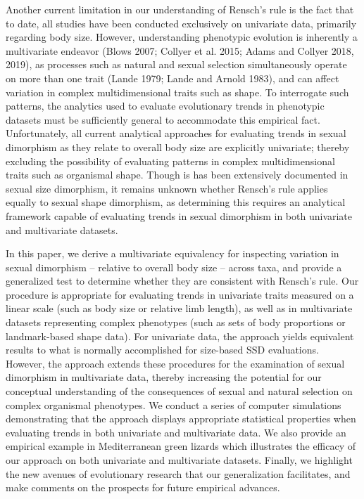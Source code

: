 \documentclass[]{article}
\begin{document}
Another current limitation in our understanding of Rensch's rule is the
fact that to date, all studies have been conducted exclusively on
univariate data, primarily regarding body size. However, understanding
phenotypic evolution is inherently a multivariate endeavor (Blows 2007;
Collyer et al. 2015; Adams and Collyer 2018, 2019), as processes such as
natural and sexual selection simultaneously operate on more than one
trait (Lande 1979; Lande and Arnold 1983), and can affect variation in
complex multidimensional traits such as shape. To interrogate such
patterns, the analytics used to evaluate evolutionary trends in
phenotypic datasets must be sufficiently general to accommodate this
empirical fact. Unfortunately, all current analytical approaches for
evaluating trends in sexual dimorphism as they relate to overall body
size are explicitly univariate; thereby excluding the possibility of
evaluating patterns in complex multidimensional traits such as
organismal shape. Though is has been extensively documented in sexual
size dimorphism, it remains unknown whether Rensch's rule applies
equally to sexual shape dimorphism, as determining this requires an
analytical framework capable of evaluating trends in sexual dimorphism
in both univariate and multivariate datasets. \hfill\break

In this paper, we derive a multivariate equivalency for inspecting
variation in sexual dimorphism -- relative to overall body size --
across taxa, and provide a generalized test to determine whether they
are consistent with Rensch's rule. Our procedure is appropriate for
evaluating trends in univariate traits measured on a linear scale (such
as body size or relative limb length), as well as in multivariate
datasets representing complex phenotypes (such as sets of body
proportions or landmark-based shape data). For univariate data, the
approach yields equivalent results to what is normally accomplished for
size-based SSD evaluations. However, the approach extends these
procedures for the examination of sexual dimorphism in multivariate
data, thereby increasing the potential for our conceptual understanding
of the consequences of sexual and natural selection on complex
organismal phenotypes. We conduct a series of computer simulations
demonstrating that the approach displays appropriate statistical
properties when evaluating trends in both univariate and multivariate
data. We also provide an empirical example in Mediterranean green
lizards which illustrates the efficacy of our approach on both
univariate and multivariate datasets. Finally, we highlight the new
avenues of evolutionary research that our generalization facilitates,
and make comments on the prospects for future empirical advances.
\end{document}
